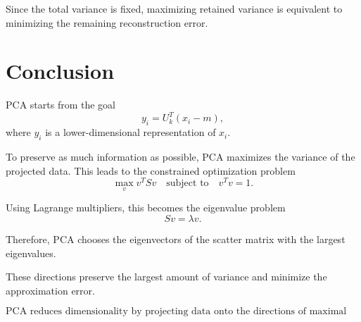 \documentclass[11pt]{article}
\begin{document}
Since the total variance is fixed, maximizing retained variance is equivalent to minimizing the remaining reconstruction error.

\section*{Conclusion}

PCA starts from the goal
\[
y_i = U_k^T(x_i-m),
\]
where \(y_i\) is a lower-dimensional representation of \(x_i\).

To preserve as much information as possible, PCA maximizes the variance of the projected data. This leads to the constrained optimization problem
\[
\max_v v^TSv
\quad
\text{subject to}
\quad
v^Tv=1.
\]

Using Lagrange multipliers, this becomes the eigenvalue problem
\[
Sv=\lambda v.
\]

Therefore, PCA chooses the eigenvectors of the scatter matrix with the largest eigenvalues.

These directions preserve the largest amount of variance and minimize the approximation error.

\[
\boxed{
\text{PCA reduces dimensionality by projecting data onto the directions of maximal variance.}
}
\]
\end{document}
